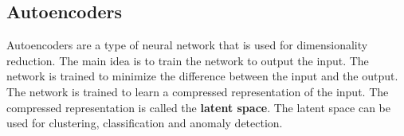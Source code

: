 \subsection{Autoencoders}
Autoencoders are a type of neural network that is used for dimensionality reduction. The main idea is to train the network to output the input. The network is trained to minimize the difference between the input and the output. The network is trained to learn a compressed representation of the input. The compressed representation is called the \textbf{latent space}. The latent space can be used for clustering, classification and anomaly detection. \newline














